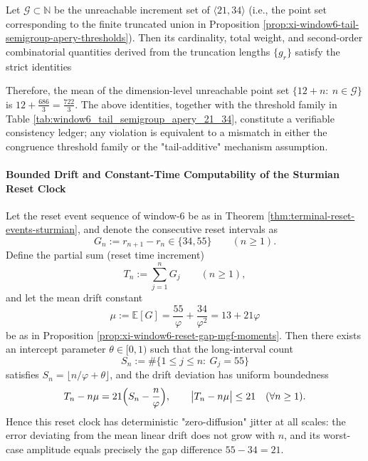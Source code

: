 \begin{proposition}\label{prop:xi-window6-gap-ledger-invariants}
Let \(\mathcal G\subset\mathbb N\) be the unreachable increment set of \(\langle 21,34\rangle\) (i.e., the point set corresponding to the finite truncated union in Proposition \ref{prop:xi-window6-tail-semigroup-apery-thresholds}).
Then its cardinality, total weight, and second-order combinatorial quantities derived from the truncation lengths \(\{g_r\}\) satisfy the strict identities

Therefore, the mean of the dimension-level unreachable point set \(\{12+n:\ n\in\mathcal G\}\) is \(12+\frac{686}{3}=\frac{722}{3}\).
The above identities, together with the threshold family in Table \ref{tab:window6_tail_semigroup_apery_21_34}, constitute a verifiable consistency ledger; any violation is equivalent to a mismatch in either the congruence threshold family or the "tail-additive" mechanism assumption.
\end{proposition}

\paragraph{Bounded Drift and Constant-Time Computability of the Sturmian Reset Clock}

\begin{proposition}\label{prop:xi-window6-reset-clock-bounded-drift}
Let the reset event sequence of window-\(6\) be as in Theorem \ref{thm:terminal-reset-events-sturmian}, and denote the consecutive reset intervals as
\[
G_n:=r_{n+1}-r_n\in\{34,55\}\qquad(n\ge 1).
\]
Define the partial sum (reset time increment)
\[
T_n:=\sum_{j=1}^{n}G_j\qquad(n\ge 1),
\]
and let the mean drift constant
\[
\mu:=\mathbb E[G]=\frac{55}{\varphi}+\frac{34}{\varphi^2}=13+21\varphi
\]
be as in Proposition \ref{prop:xi-window6-reset-gap-mgf-moments}.
Then there exists an intercept parameter \(\theta\in[0,1)\) such that the long-interval count
\[
S_n:=\#\{1\le j\le n:\ G_j=55\}
\]
satisfies \(S_n=\lfloor n/\varphi+\theta\rfloor\), and the drift deviation has uniform boundedness
\[
T_n-n\mu=21\Bigl(S_n-\frac{n}{\varphi}\Bigr),
\qquad
\bigl|T_n-n\mu\bigr|\le 21
\quad(\forall n\ge 1).
\]
Hence this reset clock has deterministic "zero-diffusion" jitter at all scales: the error deviating from the mean linear drift does not grow with \(n\), and its worst-case amplitude equals precisely the gap difference \(55-34=21\).
\end{proposition}

